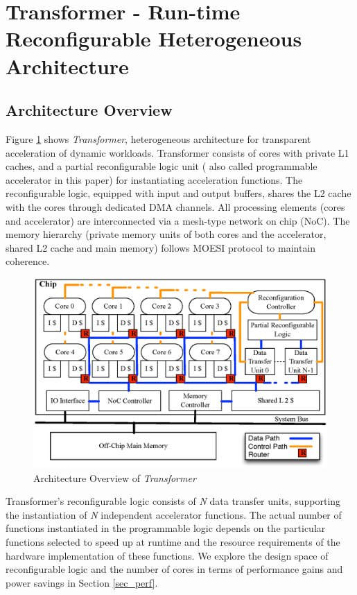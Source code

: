 \section{Transformer - Run-time Reconfigurable Heterogeneous Architecture}
\label{sec_arch}


\subsection{Architecture Overview}

Figure \ref{fig_arch} shows {\em Transformer}, heterogeneous
architecture for transparent acceleration of dynamic
workloads. Transformer consists of cores with private L1 caches, and a
partial reconfigurable logic unit ( also called programmable
accelerator in this paper) for instantiating acceleration
functions. The reconfigurable logic, equipped with input and output
buffers, shares the L2 cache with the cores through dedicated DMA
channels. All processing elements (cores and accelerator) are
interconnected via a mesh-type network on chip (NoC). The memory
hierarchy (private memory units of both cores and the accelerator,
shared L2 cache and main memory) follows MOESI protocol to maintain
coherence.

\begin{figure}
    \centering
    \includegraphics[width=4.0 in]{HPCA14-arch}
    \caption{Architecture Overview of {\em Transformer} }
    \label{fig_arch}
\vspace{-0.05in}
\end{figure}

Transformer's reconfigurable logic consists of {\em N} data transfer
units, supporting the instantiation of {\em N} independent accelerator
functions. The actual number of functions instantiated in the
programmable logic depends on the particular functions selected to
speed up at runtime and the resource requirements of the hardware
implementation of these functions. We explore the design space of
reconfigurable logic and the number of cores in terms of performance
gains and power savings in Section \ref{sec_perf}.

